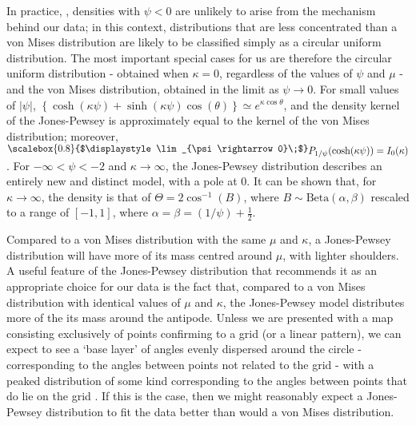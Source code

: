 \documentclass[../../ArchStats.tex]{subfiles}
\newcommand{\Lim}[1]{\raisebox{0.5ex}{\scalebox{0.8}{$\displaystyle \lim_{#1}\;$}}}
\begin{document}
In practice, , densities with $\psi < 0$ are unlikely to arise from the mechanism behind our data; in this context, distributions that are less concentrated than a von Mises distribution are likely to be classified simply as a circular uniform distribution. The most important special cases for us are therefore the circular uniform distribution - obtained when $\kappa = 0$, regardless of the values of $\psi$ and $\mu$ - and the von Mises distribution, obtained in the limit as $\psi \rightarrow 0$. For small values of $\vert \psi \vert$, $\left\lbrace \cosh(\kappa\psi) + \sinh(\kappa\psi) \cos(\theta) \right\rbrace \simeq e^{\kappa \cos \theta}$, and the density kernel of the Jones-Pewsey is approximately equal to the kernel of the von Mises distribution; moreover, $\Lim{\psi \rightarrow 0} P_{1/\psi}(\cosh(\kappa\psi)) = I_0(\kappa)$.  For $-\infty < \psi < -2$ and $\kappa \rightarrow \infty$, the Jones-Pewsey distribution describes an entirely new and distinct model, with a pole at 0. It can be shown that, for $\kappa \rightarrow \infty$, the density is that of $\Theta = 2 \cos^{-1}(B)$, where $B \sim \text{Beta}(\alpha, \beta)$ rescaled to a range  of $[-1,1]$, where $\alpha = \beta = (1/\psi) + \frac{1}{2}$.


Compared to a von Mises distribution with the same $\mu$ and $\kappa$, a Jones-Pewsey distribution  will have more of its mass centred around $\mu$, with lighter shoulders.  A useful feature of the Jones-Pewsey distribution that recommends it as an appropriate choice for our data is the fact that, compared to a von Mises distribution with identical values of $\mu$ and $\kappa$, the Jones-Pewsey model distributes more of the its mass around the antipode. Unless we are presented with a map consisting exclusively of points confirming to a grid (or a linear pattern), we can expect to see a `base layer' of angles evenly dispersed around the circle - corresponding to the angles between points not related to the grid - with a peaked distribution of some kind corresponding to the angles between points that do lie on the grid . If this is the case, then we might reasonably expect a Jones-Pewsey distribution to fit the data better than would a von Mises distribution.
\end{document}
